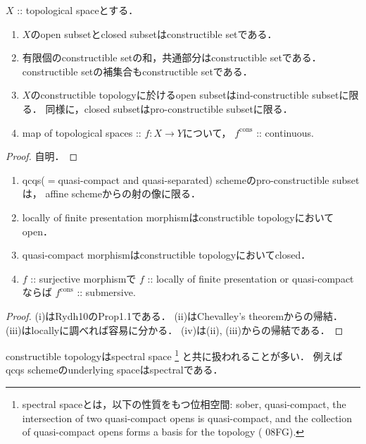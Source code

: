 \documentclass[a4paper, dvipdfmx]{jsarticle}
\newcommand{\cons}{\mathrm{cons}}
\begin{document}
\begin{Prop}
    $X$ :: topological spaceとする．
    \begin{enumerate}
    \item
        $X$のopen subsetとclosed subsetはconstructible setである．

    \item
        有限個のconstructible setの和，共通部分はconstructible setである．
        constructible setの補集合もconstructible setである．

    \item
        $X$のconstructible topologyに於けるopen subsetはind-constructible subsetに限る．
        同様に，closed subsetはpro-constructible subsetに限る．

    \item
        map of topological spaces :: $f \colon X \to Y$について，
        $f^{\cons}$ :: continuous.
    \end{enumerate}
\end{Prop}
\begin{proof}
    自明．   
\end{proof}

\begin{Prop} \label{nontrivial_constop}
    \begin{enumerate}
    \item 
        qcqs($=$quasi-compact and quasi-separated) schemeのpro-constructible subsetは，
        affine schemeからの射の像に限る．

    \item
        locally of finite presentation morphismはconstructible topologyにおいてopen．

    \item
         quasi-compact morphismはconstructible topologyにおいてclosed．

    \item
        $f$ :: surjective morphismで
        $f$ :: locally of finite presentation or quasi-compactならば
        $f^{\cons}$ :: submersive.
    \end{enumerate}
\end{Prop}
\begin{proof}
    (i)はRydh10のProp1.1である．
    (ii)はChevalley's theoremからの帰結．
    (iii)はlocallyに調べれば容易に分かる．
    (iv)は(ii), (iii)からの帰結である．
\end{proof}

\begin{Remark}
    constructible topologyはspectral space
    \footnote
    {
        spectral spaceとは，以下の性質をもつ位相空間:
        sober, quasi-compact,
        the intersection of two quasi-compact opens is quasi-compact,
        and the collection of quasi-compact opens forms a basis for the topology
        (\cite{SP} 08FG).
    }
    と共に扱われることが多い．
    例えばqcqs schemeのunderlying spaceはspectralである．
\end{Remark}
\end{document}
